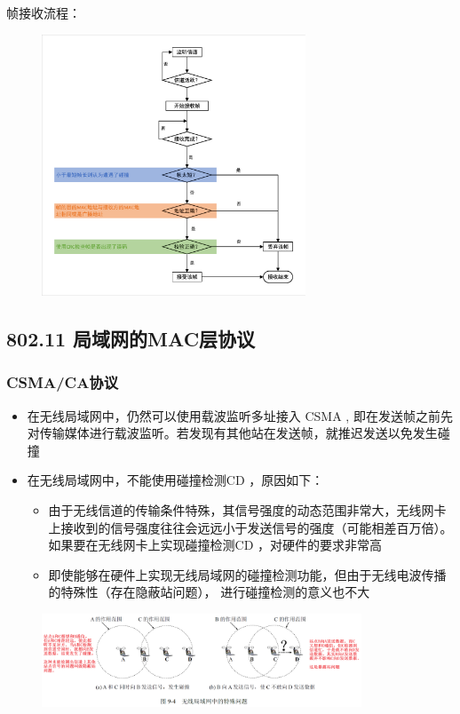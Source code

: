 \documentclass[cs4size,a4paper,10pt]{ctexart}
\begin{document}
	帧接收流程：
	\begin{figure}[H]
		\centering
		\includegraphics[width=0.7\textwidth]{img/3.4.2.2}
	\end{figure}

	\subsection{802.11 局域网的MAC层协议}

	\subsubsection{CSMA/CA协议}

	\begin{itemize}
		\item 在无线局域网中，仍然可以使用载波监听多址接入 CSMA , 即在发送帧之前先对传输媒体进行载波监听。若发现有其他站在发送帧，就推迟发送以免发生碰撞
		\item 在无线局域网中，不能使用碰撞检测CD ，原因如下：
		\begin{itemize}
			\item 由于无线信道的传输条件特殊，其信号强度的动态范围非常大，无线网卡上接收到的信号强度往往会远远小于发送信号的强度（可能相差百万倍）。如果要在无线网卡上实现碰撞检测CD ，对硬件的要求非常高
			\item 即使能够在硬件上实现无线局域网的碰撞检测功能，但由于无线电波传播的特殊性（存在隐蔽站问题）， 进行碰撞检测的意义也不大
		\end{itemize}
	\end{itemize}

	\begin{figure}[H]
		\centering
		\includegraphics[width=0.85\textwidth]{img/3.4.3.1}
	\end{figure}
\end{document}
